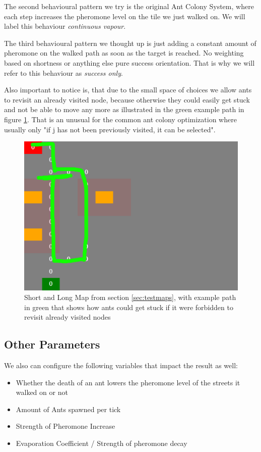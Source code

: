 The second behavioural pattern we try is the original Ant Colony System\cite{maniezzo2002ant}, where each step increases the pheromone level on the tile we just walked on. We will label this behaviour \textit{continuous vapour}.

The third behavioural pattern we thought up is just adding a constant amount of pheromone on the walked path as soon as the target is reached. No weighting based on shortness or anything else pure success orientation. That is why we will refer to this behaviour as \textit{success only}.

Also important to notice is, that due to the small space of choices we allow ants to revisit an already visited node, because otherwise they could easily get stuck  and not be able to move any more as illustrated in the green example path in figure \ref{fig:gettingstuck}. That is an unusual for the common ant colony optimization where usually only "if j has  not  been  previously  visited,  it  can  be  selected"\cite{dorigo2006ant}.

\begin{figure}[H]
  \centering
  \includegraphics[width=1\linewidth]{images/map_shortlong_deadend}
  \caption{Short and Long Map from section \ref{sec:testmaps}, with example path in green that shows how ants could get stuck if it were forbidden to revisit already visited nodes}
  \label{fig:gettingstuck}
\end{figure}

\subsection{Other Parameters}
\label{sec:otherparamas}
We also can configure the following variables that impact the result as well:
\begin{itemize}
\item  Whether the death of an ant lowers the pheromone level of the streets it walked on or not
\item Amount of Ants spawned per tick
\item Strength of Pheromone Increase
\item Evaporation Coefficient / Strength of pheromone decay
\end{itemize}


